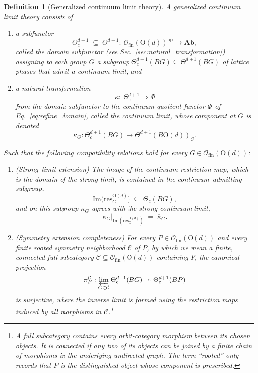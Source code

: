 \documentclass[aps,prx,reprint,superscriptaddress,twocolumn,amsmath,amssymb,amsfonts, nofootinbib]{revtex4-2}
\newcommand{\ofin}{\mathcal{O}_{\text{fin}}}
\newcommand{\res}{\text{res}}
\theoremstyle{apsstyle}
\newtheorem{definition}[theorem]{Definition}
\begin{document}
\bigskip

\begin{definition}[Generalized continuum limit theory]
\label{def:gen_con_lim}
A \emph{generalized continuum limit theory} consists of
\begin{enumerate}
  \item a subfunctor 
    \begin{equation*}
      \Theta^{d+1}_c\;\subseteq\;\Theta^{d+1}:\ \ofin(\mathrm{O}(d))^{\mathrm{op}}\to\mathbf{Ab},
    \end{equation*}
    called the domain subfunctor (see Sec.~\ref{sec:natural_transformation}) assigning to each group $G$ a subgroup $\Theta^{d+1}_c(BG)\subseteq\Theta^{d+1}(BG)$ of lattice phases that admit a continuum limit, and
  \item a natural transformation
    \begin{equation*}
      \kappa:\ \Theta^{d+1}_c\Rightarrow\Phi
    \end{equation*}
    from the domain subfunctor to the continuum quotient functor $\Phi$ of Eq.~\ref{eq:refine_domain}, called the \emph{continuum limit}, whose component at $G$ is denoted
    \begin{equation*}
      \kappa_G:\Theta^{d+1}_c(BG)\to \Theta^{d+1}(B\mathrm{O}(d))_G.
    \end{equation*}
\end{enumerate}
Such that the following compatibility relations hold for every $G\in\ofin(\mathrm{O}(d))$:
\begin{enumerate}
  \item[(GL1)] (\emph{Strong–limit extension})
  The image of the continuum restriction map, which is the domain of the strong limit, is contained in the continuum–admitting
  subgroup,
  \[
    \mathrm{Im}\bigl(\res^{\mathrm{O}(d)}_{G}\bigr)
      \;\subseteq\;
      \Theta_{c}(BG),
  \]
  and on this subgroup $\kappa_{G}$ agrees with the strong continuum limit,
  \[
      \kappa_{G}\big\vert_{\mathrm{Im}(\res^{\mathrm{O}(d)}_{G})}
      \;=\;
      \overline{\kappa}_{G}.
  \]
  \item[(GL2)] (\emph{Symmetry extension completeness})
  For every $P\in\ofin(\mathrm{O}(d))$ and every finite rooted symmetry neighborhood $\mathcal C$ of $P$, by which we mean a finite, connected full subcategory $\mathcal{C} \subseteq\ofin(\mathrm{O}(d))$ containing $P$, the canonical projection
\begin{equation}
\pi_P^{\mathcal C}:
\varprojlim_{G\in\mathcal C}
\Theta_{\mathrm c}^{d+1}(BG)
\twoheadrightarrow
\Theta_{\mathrm c}^{d+1}(BP)
\label{eq:finite_symmetry_extension_completeness}
\end{equation}
is surjective, where the inverse limit is formed using the restriction maps
induced by all morphisms in $\mathcal C$.\footnote{A full subcategory contains every orbit-category morphism between its chosen objects. It is connected if any two of its objects can be joined by a finite chain of morphisms in the underlying undirected graph. The term ``rooted'' only records that $P$ is the distinguished object whose component is prescribed.}


\end{enumerate}
\end{definition}
\end{document}
